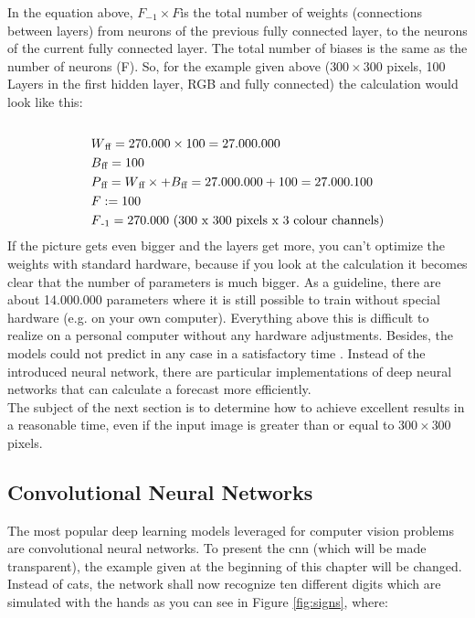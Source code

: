 In the equation above, \( F_{-1} \times F \)is the total number of weights (connections between layers) from neurons of the previous fully connected layer, to the neurons of the current fully connected layer. The total number of biases is the same as the number of neurons (F). So, for the example given above (\( 300 \times 300\) pixels, 100 Layers in the first hidden layer, RGB and fully connected) the calculation would look like this:\\\\
\begin{align*}
& W\textsubscript{ff} =  270.000 \times 100 = 27.000.000  \\
& B\textsubscript{ff} = 100 \\
& P\textsubscript{ff} = W\textsubscript{ff}\times +  B\textsubscript{ff} = 27.000.000 +100 =27.000.100    \\
& F: = 100 \\
& F\textsubscript{-1} = 270.000 \text{ (300 x 300 pixels x 3 colour channels})\\
\end{align*}
If the picture gets even bigger and the layers get more, you can't optimize the weights with standard hardware, because if you look at the calculation it becomes clear that the number of parameters is much bigger. As a guideline, there are about 14.000.000 parameters where it is still possible to train without special hardware (e.g. on your own computer). Everything above this is difficult to realize on a personal computer without any hardware adjustments.   Besides, the models could not predict in any case in a satisfactory time \cite{DBLP:journals/corr/TraskGR15}. Instead of the introduced neural network, there are particular implementations of deep neural networks that can calculate a forecast more efficiently.\\

The subject of the next section is to determine how to achieve excellent results in a reasonable time, even if the input image is greater than or equal to \( 300 \times 300\) pixels.

\subsection{Convolutional Neural Networks}
\label{subsec:cnn}

The most popular deep learning models leveraged for computer vision problems are convolutional neural networks. To present the \Gls{cnn} (which will be made transparent), the example given at the beginning of this chapter will be changed. Instead of cats, the network shall now recognize ten different digits which are simulated with the hands as you can see in Figure \ref{fig:signs}, where:


